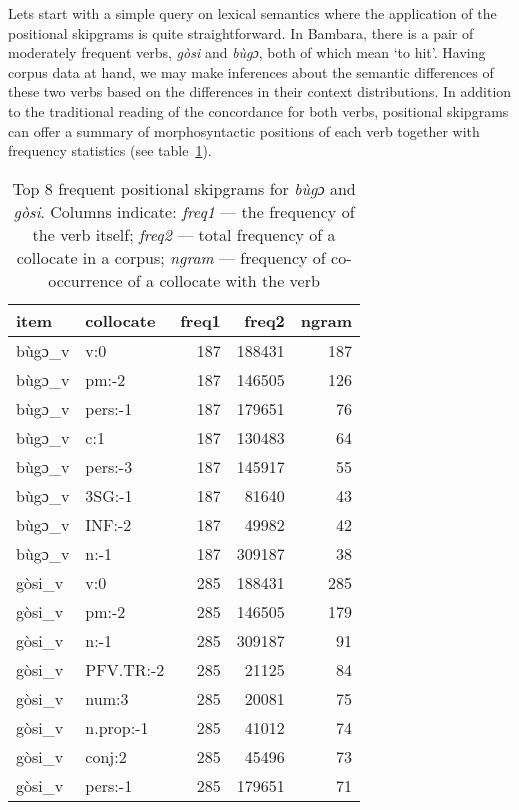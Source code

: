 \documentclass[12pt]{article}
\begin{document}
Lets start with a simple query on lexical semantics where the
application of the positional skipgrams is quite straightforward.  In
Bambara, there is a pair of moderately frequent verbs, \textit{gòsi}
and \textit{bùgɔ}, both of which mean ‘to hit’. Having corpus data at
hand, we may make inferences about the semantic differences of these
two verbs based on the differences in their context distributions.  In
addition to the traditional reading of the concordance for both verbs,
positional skipgrams can offer a summary of morphosyntactic positions of
each verb together with frequency statistics (see table~\ref{tab:bugogosi.freq}). 

\begin{table}[ht]
  \small
  \centering
  \begin{tabular}{llrrr}
    \toprule
    item & collocate & freq1 & freq2 & ngram\\
    \midrule
    bùgɔ\_v & v:0 & 187 & 188431 & 187\\
    bùgɔ\_v & pm:-2 & 187 & 146505 & 126\\
    bùgɔ\_v & pers:-1 & 187 & 179651 & 76\\
    bùgɔ\_v & c:1 & 187 & 130483 & 64\\
    bùgɔ\_v & pers:-3 & 187 & 145917 & 55\\
    bùgɔ\_v & 3SG:-1 & 187 & 81640 & 43\\
    bùgɔ\_v & INF:-2 & 187 & 49982 & 42\\
    bùgɔ\_v & n:-1 & 187 & 309187 & 38\\
    \addlinespace
    gòsi\_v & v:0 & 285 & 188431 & 285\\
    gòsi\_v & pm:-2 & 285 & 146505 & 179\\
    gòsi\_v & n:-1 & 285 & 309187 & 91\\
    gòsi\_v & PFV.TR:-2 & 285 & 21125 & 84\\
    gòsi\_v & num:3 & 285 & 20081 & 75\\
    gòsi\_v & n.prop:-1 & 285 & 41012 & 74\\
    gòsi\_v & conj:2 & 285 & 45496 & 73\\
    gòsi\_v & pers:-1 & 285 & 179651 & 71\\
    \bottomrule
  \end{tabular}
  
  \caption{Top 8 frequent positional skipgrams for \textit{bùgɔ} and
    \textit{gòsi}. Columns indicate: \textit{freq1} — the frequency of
    the verb itself; \textit{freq2} — total frequency of a collocate
    in a corpus; \textit{ngram} — frequency of co-occurrence of a
    collocate with the verb}
  \label{tab:bugogosi.freq}
\end{table}
\end{document}
